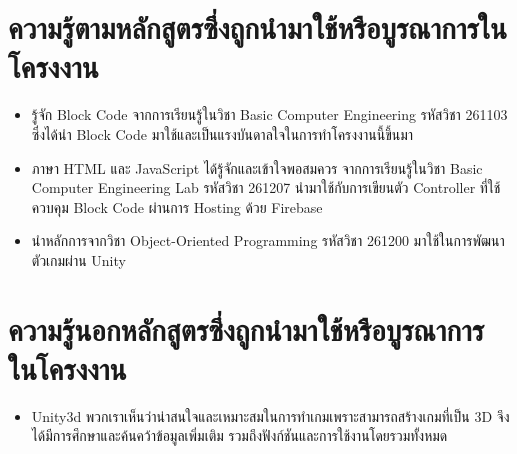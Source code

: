 \section{ความรู้ตามหลักสูตรซึ่งถูกนำมาใช้หรือบูรณาการในโครงงาน}
\begin{itemize}
  \item รู้จัก Block Code จากการเรียนรู้ในวิชา Basic Computer Engineering รหัสวิชา 261103 ซึ่งได้นำ Block Code มาใช้และเป็นแรงบันดาลใจในการทำโครงงานนี้ขึ้นมา
  \item ภาษา HTML และ JavaScript ได้รู้จักและเข้าใจพอสมควร จากการเรียนรู้ในวิชา Basic Computer Engineering Lab รหัสวิชา 261207 นำมาใช้กับการเขียนตัว Controller ที่ใช้ควบคุม Block Code ผ่านการ Hosting ด้วย Firebase
  \item นำหลักการจากวิชา Object-Oriented Programming รหัสวิชา 261200 มาใช้ในการพัฒนาตัวเกมผ่าน Unity
\end{itemize}

\section{ความรู้นอกหลักสูตรซึ่งถูกนำมาใช้หรือบูรณาการในโครงงาน}
\begin{itemize}
  \item Unity3d พวกเราเห็นว่าน่าสนใจและเหมาะสมในการทำเกมเพราะสามารถสร้างเกมที่เป็น 3D จึงได้มีการศึกษาและค้นคว้าข้อมูลเพิ่มเติม รวมถึงฟังก์ชันและการใช้งานโดยรวมทั้งหมด
\end{itemize}





